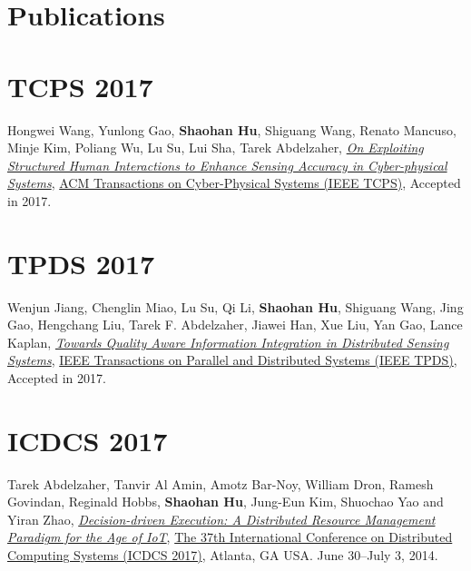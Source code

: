 \section{\sc Publications}


\section{\sc TCPS 2017}\hypertarget{wang2017tcps}{}
Hongwei Wang, Yunlong Gao, \textbf{Shaohan Hu}, Shiguang Wang, Renato Mancuso, Minje Kim, Poliang Wu, Lu Su, Lui Sha, Tarek Abdelzaher,
\href{}{\emph{On Exploiting Structured Human Interactions to Enhance Sensing Accuracy in Cyber-physical Systems}},
\href{http://tcps.acm.org/}{\textsf{ACM Transactions on Cyber-Physical Systems (IEEE TCPS)}},
Accepted in 2017.

\section{\sc TPDS 2017}\hypertarget{su2017tpds}{}
Wenjun Jiang, Chenglin Miao, Lu Su, Qi Li, \textbf{Shaohan Hu}, Shiguang Wang, Jing Gao, Hengchang Liu, Tarek F. Abdelzaher, Jiawei Han, Xue Liu, Yan Gao, Lance Kaplan,
\href{}{\emph{Towards Quality Aware Information Integration in Distributed Sensing Systems}},
\href{https://www.computer.org/web/tpds}{\textsf{IEEE Transactions on Parallel and Distributed Systems (IEEE TPDS)}},
Accepted in 2017.

\section{\sc ICDCS 2017}\hypertarget{li2017abdelzaher}{}
Tarek Abdelzaher, Tanvir Al Amin, Amotz Bar-Noy, William Dron, Ramesh Govindan, Reginald Hobbs, \textbf{Shaohan Hu}, Jung-Eun Kim, Shuochao Yao and Yiran Zhao,
\href{}{\emph{Decision-driven Execution: A Distributed Resource Management Paradigm for the Age of IoT}},
\href{http://icdcs2017.gatech.edu/}{\textsf{The 37th International Conference on Distributed Computing Systems (ICDCS 2017)}},
Atlanta, GA USA. June 30--July 3, 2014.

